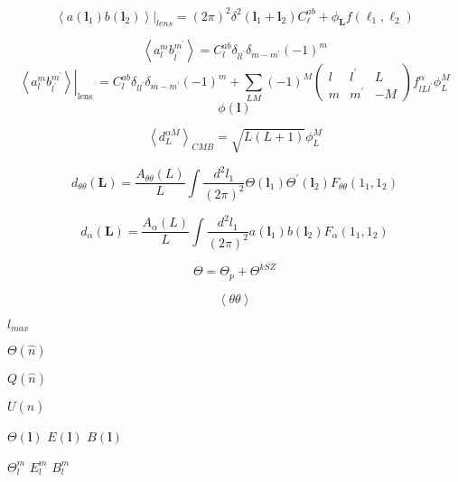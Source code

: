 \documentclass[12pt, notitlepage, onecolumn, amsmath, amssymb, aps]{revtex4-1}
\begin{document}
\begin{equation}
\left.\left\langle a\left(\mathbf{l}_{1}\right) b\left(\mathbf{l}_{2}\right)\right\rangle\right|_{lens}=(2 \pi)^{2} \delta^{2}\left(\mathbf{l}_{1}+\mathbf{l}_{2}\right) C_{\ell}^{ab}+\phi_{\mathbf{L}} f\left(\ell_{1}, \ell_{2}\right)
\end{equation}

\begin{equation}
  \left\langle a_{l}^{m} b_{l^{\prime}}^{m^{\prime}}\right\rangle=C_{l}^{a b} \delta_{l l^{\prime}} \delta_{m-m^{\prime}}(-1)^{m}
\end{equation}
\begin{equation}
  \left.\left\langle a_{l}^{m} b_{l^{\prime}}^{m^{\prime}}\right\rangle\right|_{\text {lens }}=C_{l}^{a b} \delta_{l l^{\prime}} \delta_{m-m^{\prime}}(-1)^{m}+\sum_{L M}(-1)^{M}\left(\begin{array}{ccc}
l & l^{\prime} & L \\
m & m^{\prime} & -M
\end{array}\right) f_{l L l^{\prime}}^{\alpha} \phi_{L}^{M}
\end{equation}
\begin{equation}
  \phi(\mathbf{l})
\end{equation}

\begin{equation}
  \left\langle d_{L}^{\alpha M}\right\rangle_{CMB}=\sqrt{L(L+1)} \phi_{L}^{M}
\end{equation}

\begin{equation}
  d_{\theta\theta}(\mathbf{L})=\frac{A_{\theta\theta}(L)}{L} \int \frac{d^{2} l_{1}}{(2 \pi)^{2}} \Theta\left(\mathbf{l}_{1}\right) \Theta^{\prime}\left(\mathbf{l}_{2}\right) F_{\theta\theta}\left(1_{1}, 1_{2}\right)
\end{equation}

\begin{equation}
    d_{\alpha}(\mathbf{L})=\frac{A_{\alpha}(L)}{L} \int \frac{d^{2} l_{1}}{(2 \pi)^{2}} a\left(\mathbf{l}_{1}\right) b\left(\mathbf{l}_{2}\right) F_{\alpha}\left(1_{1}, 1_{2}\right)
\end{equation}
    
\begin{equation}
  \Theta = \Theta_{p} + \Theta^{kSZ}
\end{equation}

\begin{equation}
  \left\langle \theta \theta\right\rangle
\end{equation}

\(l_{max}\)

\(\Theta(\hat{n})\)

\(Q(\hat{n})\)

\(U(\hat{n})\)

\(\Theta(\mathbf{l})\)
\(E(\mathbf{l})\)
\(B(\mathbf{l})\)

\(\Theta_{l}^{m}\)
\(E_{l}^{m}\)
\(B_{l}^{m}\)
\end{document}

